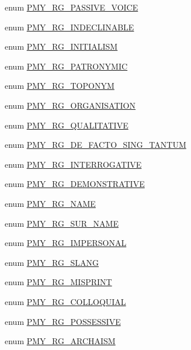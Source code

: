 \begin{DoxyCompactItemize}
\item 
enum \hyperlink{gramtab__consts_8php_aa15a0dbe3364ca89e1b96f8047360afd}{PMY\_\-RG\_\-PASSIVE\_\-VOICE} 
\item 
enum \hyperlink{gramtab__consts_8php_ab4411240d847c82c75fa0ae8dd090ea3}{PMY\_\-RG\_\-INDECLINABLE} 
\item 
enum \hyperlink{gramtab__consts_8php_a02684e988bbb64a5ec0971c2192790c4}{PMY\_\-RG\_\-INITIALISM} 
\item 
enum \hyperlink{gramtab__consts_8php_a2a9f8f24df5ef528676f6e02712cc366}{PMY\_\-RG\_\-PATRONYMIC} 
\item 
enum \hyperlink{gramtab__consts_8php_ada2081cd6e043dcc4ffded39eb8522fb}{PMY\_\-RG\_\-TOPONYM} 
\item 
enum \hyperlink{gramtab__consts_8php_a7a639a05340f7e3235b43c63d7d0b7d7}{PMY\_\-RG\_\-ORGANISATION} 
\item 
enum \hyperlink{gramtab__consts_8php_a3b5d13d14ca100e4c17db99b1a7ce35f}{PMY\_\-RG\_\-QUALITATIVE} 
\item 
enum \hyperlink{gramtab__consts_8php_ab446d89b0d6c2fc6b139672251a42181}{PMY\_\-RG\_\-DE\_\-FACTO\_\-SING\_\-TANTUM} 
\item 
enum \hyperlink{gramtab__consts_8php_aafa7492980908ec5015d42bfac9784ee}{PMY\_\-RG\_\-INTERROGATIVE} 
\item 
enum \hyperlink{gramtab__consts_8php_a66365f6ba309d0e656792a07e1e8bc3e}{PMY\_\-RG\_\-DEMONSTRATIVE} 
\item 
enum \hyperlink{gramtab__consts_8php_a40854e78d6f588badea621cc5c7e059d}{PMY\_\-RG\_\-NAME} 
\item 
enum \hyperlink{gramtab__consts_8php_a586497452082874b5cd8db8fd8baffa2}{PMY\_\-RG\_\-SUR\_\-NAME} 
\item 
enum \hyperlink{gramtab__consts_8php_a1d8b870c5c78bfda337c215a4a9a7902}{PMY\_\-RG\_\-IMPERSONAL} 
\item 
enum \hyperlink{gramtab__consts_8php_a525c575ea0a1612045ebdaf02e68efbc}{PMY\_\-RG\_\-SLANG} 
\item 
enum \hyperlink{gramtab__consts_8php_a899b6d5dc01a196af0308fdc8190efff}{PMY\_\-RG\_\-MISPRINT} 
\item 
enum \hyperlink{gramtab__consts_8php_a66a0e133580fef63343fb12d3e23a087}{PMY\_\-RG\_\-COLLOQUIAL} 
\item 
enum \hyperlink{gramtab__consts_8php_a8c2e243e436403cbb90c514116cbf791}{PMY\_\-RG\_\-POSSESSIVE} 
\item 
enum \hyperlink{gramtab__consts_8php_aaab63f59c58fd3fa77325b2f0c8dbe4b}{PMY\_\-RG\_\-ARCHAISM} 

\end{DoxyCompactItemize}
